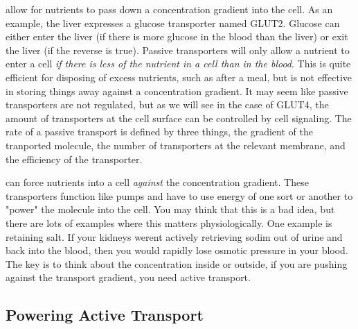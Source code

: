 \documentclass{tufte-handout}
\begin{document}
 allow for nutrients to pass down a concentration gradient into the cell.  As an example, the liver expresses a glucose transporter named GLUT2.  Glucose can either enter the liver (if there is more glucose in the blood than the liver) or exit the liver (if the reverse is true).  Passive transporters will only allow a nutrient to enter a cell \emph{if there is less of the nutrient in a cell than in the blood}.  This is quite efficient for disposing of excess nutrients, such as after a meal, but is not effective in storing things away against a concentration gradient.  It may seem like passive transporters are not regulated, but as we will see in the case of GLUT4, the amount of transporters at the cell surface can be controlled by cell signaling.  The rate of a passive transport is defined by three things, the gradient of the tranported molecule, the number of transporters at the relevant membrane, and the efficiency of the transporter.

 can force nutrients into a cell \emph{against} the concentration gradient.  These transporters function like pumps and have to use energy of one sort or another to "power" the molecule into the cell.  You may think that this is a bad idea, but there are lots of examples where this matters physiologically.  One example is retaining salt.  If your kidneys werent actively retrieving sodim out of urine and back into the blood, then you would rapidly lose osmotic pressure in your blood.  The key is to think about the concentration inside or outside, if you are pushing against the transport gradient, you need active transport.

\subsection{Powering Active Transport}
\end{document}
